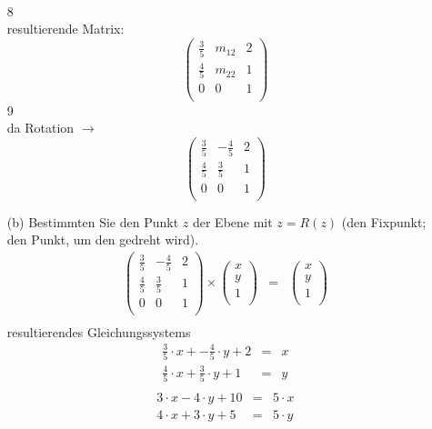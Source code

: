 \documentclass[11pt]{article}
\begin{document}
\begin{enumerate}
\begin{eqnarray*}
\end{eqnarray*}
8\\
resultierende Matrix:
$$\begin{pmatrix}
\frac{3}{5} & m_{12} & 2 \\
\frac{4}{5} & m_{22} & 1 \\
0 & 0 & 1 \\
\end{pmatrix}$$
9\\
da Rotation $\rightarrow $
$$\begin{pmatrix}
\frac{3}{5} & -\frac{4}{5} & 2 \\
\frac{4}{5} & \frac{3}{5} & 1 \\
0 & 0 & 1 \\
\end{pmatrix}$$
\item[(b)] Bestimmten Sie den Punkt $z$ der Ebene mit $z = R(z)$ (den Fixpunkt; den Punkt, um den gedreht wird).
\begin{eqnarray*}
\begin{pmatrix}
\frac{3}{5} & -\frac{4}{5} & 2 \\
\frac{4}{5} & \frac{3}{5} & 1 \\
0 & 0 & 1 \\
\end{pmatrix}
\times 
\begin{pmatrix}
x \\ y \\ 1 \\
\end{pmatrix}
&=&
\begin{pmatrix}
x \\ y \\ 1 \\
\end{pmatrix} \\
\end{eqnarray*}
resultierendes Gleichungssystems
\begin{eqnarray*}
\frac{3}{5} \cdot x + -\frac{4}{5} \cdot y + 2 &=& x \\
\frac{4}{5} \cdot x + \frac{3}{5} \cdot y + 1 &=& y \\ 
\end{eqnarray*}
\begin{eqnarray*}
3 \cdot x - 4 \cdot y + 10 &=& 5 \cdot x \\
4 \cdot x + 3 \cdot y + 5 &=& 5 \cdot y \\ 
\end{eqnarray*}
\begin{eqnarray*}

\end{eqnarray*}
\end{enumerate}
\end{document}
